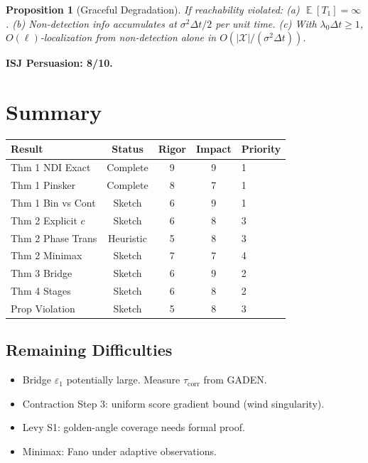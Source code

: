 \documentclass[11pt]{article}
\newtheorem{proposition}[theorem]{Proposition}
\DeclareMathOperator{\E}{\mathbb{E}}
\begin{document}
\begin{proposition}[Graceful Degradation]\label{prop:reach_violation}
If reachability violated: (a) $\E[T_1]=\infty$. (b) Non-detection info accumulates at $\sigma^2\Delta t/2$ per unit time. (c) With $\lambda_0\Delta t\geq 1$, $O(\ell)$-localization from non-detection alone in $O(|\mathcal{X}|/(\sigma^2\Delta t))$.
\end{proposition}

\medskip\noindent\textbf{ISJ Persuasion: 8/10.}

\newpage
\section{Summary}

\begin{center}
\begin{tabular}{lcccl}
\toprule
Result & Status & Rigor & Impact & Priority \\
\midrule
Thm 1 NDI Exact & Complete & 9 & 9 & 1\\
Thm 1 Pinsker & Complete & 8 & 7 & 1\\
Thm 1 Bin vs Cont & Sketch & 6 & 9 & 1\\
Thm 2 Explicit $c$ & Sketch & 6 & 8 & 3\\
Thm 2 Phase Trans & Heuristic & 5 & 8 & 3\\
Thm 2 Minimax & Sketch & 7 & 7 & 4\\
Thm 3 Bridge & Sketch & 6 & 9 & 2\\
Thm 4 Stages & Sketch & 6 & 8 & 2\\
Prop Violation & Sketch & 5 & 8 & 3\\
\bottomrule
\end{tabular}
\end{center}

\subsection{Remaining Difficulties}
\begin{itemize}
\item Bridge $\varepsilon_1$ potentially large. Measure $\tau_{\mathrm{corr}}$ from GADEN.
\item Contraction Step 3: uniform score gradient bound (wind singularity).
\item Levy S1: golden-angle coverage needs formal proof.
\item Minimax: Fano under adaptive observations.
\end{itemize}
\end{document}
